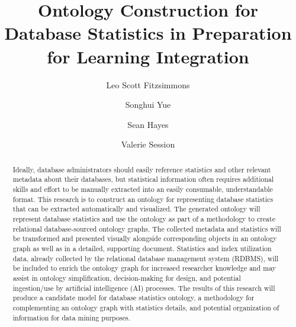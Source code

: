 \documentclass[sigconf]{acmart}
\begin{document}
\title{Ontology Construction for Database Statistics in Preparation for Learning Integration}

\author{Leo Scott Fitzsimmons}

\author{Songhui Yue}

\author{Sean Hayes}
	
\author{Valerie Session}


\renewcommand{\shortauthors}{Trovato et al.}

\begin{abstract}
Ideally, database administrators should easily reference statistics and other relevant metadata about their databases, but statistical information often requires additional skills and effort to be manually extracted into an easily consumable, understandable format. This research is to construct an ontology for representing database statistics that can be extracted automatically and visualized. The generated ontology will represent database statistics and use the ontology as part of a methodology to create relational database-sourced ontology graphs. The collected metadata and statistics will be transformed and presented visually alongside corresponding objects in an ontology graph as well as in a detailed, supporting document. Statistics and index utilization data, already collected by the relational database management system (RDBMS), will be included to enrich the ontology graph for increased researcher knowledge and may assist in ontology simplification, decision-making for design, and potential ingestion/use by artificial intelligence (AI) processes. The results of this research will produce a candidate model for database statistics ontology, a methodology for complementing an ontology graph with statistics details, and potential organization of information for data mining purposes. 
\end{abstract}
\end{document}

